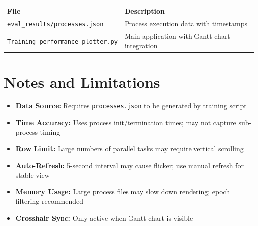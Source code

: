 \documentclass[11pt,a4paper]{article}
\begin{document}
\begin{table}[h]
\centering
\begin{tabular}{@{}lp{8cm}@{}}
\toprule
\textbf{File} & \textbf{Description} \\
\midrule
\texttt{eval\_results/processes.json} & Process execution data with timestamps \\
\texttt{Training\_performance\_plotter.py} & Main application with Gantt chart integration \\
\bottomrule
\end{tabular}
\end{table}

\section{Notes and Limitations}

\begin{itemize}
    \item \textbf{Data Source:} Requires \texttt{processes.json} to be generated by training script
    \item \textbf{Time Accuracy:} Uses process init/termination times; may not capture sub-process timing
    \item \textbf{Row Limit:} Large numbers of parallel tasks may require vertical scrolling
    \item \textbf{Auto-Refresh:} 5-second interval may cause flicker; use manual refresh for stable view
    \item \textbf{Memory Usage:} Large process files may slow down rendering; epoch filtering recommended
    \item \textbf{Crosshair Sync:} Only active when Gantt chart is visible
\end{itemize}
\end{document}

